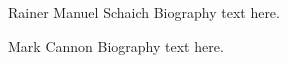 \documentclass[journal]{IEEEtran}
\theoremstyle{remark}
\theoremstyle{definition}
\begin{document}
\begin{IEEEbiography}{Rainer Manuel Schaich}
Biography text here.
\end{IEEEbiography}

\begin{IEEEbiography}{Mark Cannon}
Biography text here.
\end{IEEEbiography}







\end{document}
